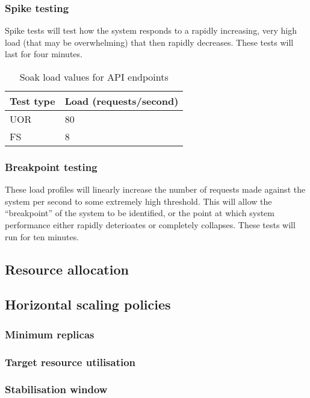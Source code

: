 \subsubsection{Spike testing}

Spike tests will test how the system responds to a rapidly increasing, very high load (that may be overwhelming) that then rapidly decreases. These tests will last for four minutes.

\begin{table}[h]
    \centering
    \begin{tabularx}{\textwidth}{|X|X|}
        \hline
        \textbf{Test type} & \textbf{Load (requests/second)}  \\ \hline
        UOR & 80 \\ \hline
        FS & 8 \\ \hline
    \end{tabularx}
    \caption{Soak load values for API endpoints}
    \label{table:test-spike-load-plan}
\end{table}

\subsubsection{Breakpoint testing}

These load profiles will linearly increase the number of requests made against the system per second to some extremely high threshold. This will allow the ``breakpoint'' of the system to be identified, or the point at which system performance either rapidly deterioates or completely collapses. These tests will run for ten minutes.

\subsection{Resource allocation}
\subsection{Horizontal scaling policies}
\subsubsection{Minimum replicas}
\subsubsection{Target resource utilisation}
\subsubsection{Stabilisation window}